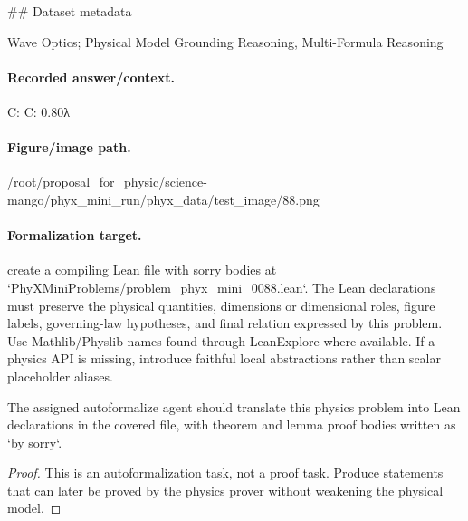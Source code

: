 \#\# Dataset metadata

Wave Optics; Physical Model Grounding Reasoning, Multi-Formula Reasoning

\paragraph{Recorded answer/context.}
C: C: 0.80λ

\paragraph{Figure/image path.}
/root/proposal\_for\_physic/science-mango/phyx\_mini\_run/phyx\_data/test\_image/88.png

\paragraph{Formalization target.}
create a compiling Lean file with sorry bodies at `PhyXMiniProblems/problem\_phyx\_mini\_0088.lean`. The Lean declarations must preserve the physical quantities, dimensions or dimensional roles, figure labels, governing-law hypotheses, and final relation expressed by this problem.
Use Mathlib/Physlib names found through LeanExplore where available. If a physics API is missing, introduce faithful local abstractions rather than scalar placeholder aliases.

\begin{theorem}
\label{thm:physics:phyx_mini_0088:target}
The assigned autoformalize agent should translate this physics problem into Lean declarations in the covered file, with theorem and lemma proof bodies written as `by sorry`.
\end{theorem}
\begin{proof}
This is an autoformalization task, not a proof task. Produce statements that can later be proved by the physics prover without weakening the physical model.
\end{proof}

